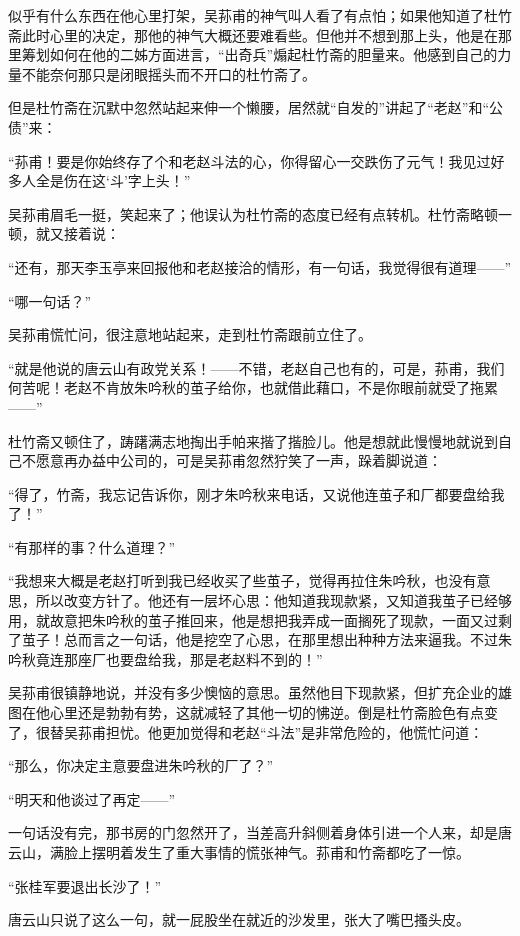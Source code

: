 \par 似乎有什么东西在他心里打架，吴荪甫的神气叫人看了有点怕；如果他知道了杜竹斋此时心里的决定，那他的神气大概还要难看些。但他并不想到那上头，他是在那里筹划如何在他的二姊方面进言，“出奇兵”煽起杜竹斋的胆量来。他感到自己的力量不能奈何那只是闭眼摇头而不开口的杜竹斋了。
\par 但是杜竹斋在沉默中忽然站起来伸一个懒腰，居然就“自发的”讲起了“老赵”和“公债”来：
\par “荪甫！要是你始终存了个和老赵斗法的心，你得留心一交跌伤了元气！我见过好多人全是伤在这‘斗’字上头！”
\par 吴荪甫眉毛一挺，笑起来了；他误认为杜竹斋的态度已经有点转机。杜竹斋略顿一顿，就又接着说：
\par “还有，那天李玉亭来回报他和老赵接洽的情形，有一句话，我觉得很有道理——”
\par “哪一句话？”
\par 吴荪甫慌忙问，很注意地站起来，走到杜竹斋跟前立住了。
\par “就是他说的唐云山有政党关系！——不错，老赵自己也有的，可是，荪甫，我们何苦呢！老赵不肯放朱吟秋的茧子给你，也就借此藉口，不是你眼前就受了拖累——”
\par 杜竹斋又顿住了，踌躇满志地掏出手帕来揩了揩脸儿。他是想就此慢慢地就说到自己不愿意再办益中公司的，可是吴荪甫忽然狞笑了一声，跺着脚说道：
\par “得了，竹斋，我忘记告诉你，刚才朱吟秋来电话，又说他连茧子和厂都要盘给我了！”
\par “有那样的事？什么道理？”
\par “我想来大概是老赵打听到我已经收买了些茧子，觉得再拉住朱吟秋，也没有意思，所以改变方针了。他还有一层坏心思：他知道我现款紧，又知道我茧子已经够用，就故意把朱吟秋的茧子推回来，他是想把我弄成一面搁死了现款，一面又过剩了茧子！总而言之一句话，他是挖空了心思，在那里想出种种方法来逼我。不过朱吟秋竟连那座厂也要盘给我，那是老赵料不到的！”
\par 吴荪甫很镇静地说，并没有多少懊恼的意思。虽然他目下现款紧，但扩充企业的雄图在他心里还是勃勃有势，这就减轻了其他一切的怫逆。倒是杜竹斋脸色有点变了，很替吴荪甫担忧。他更加觉得和老赵“斗法”是非常危险的，他慌忙问道：
\par “那么，你决定主意要盘进朱吟秋的厂了？”
\par “明天和他谈过了再定——”
\par 一句话没有完，那书房的门忽然开了，当差高升斜侧着身体引进一个人来，却是唐云山，满脸上摆明着发生了重大事情的慌张神气。荪甫和竹斋都吃了一惊。
\par “张桂军要退出长沙了！”
\par 唐云山只说了这么一句，就一屁股坐在就近的沙发里，张大了嘴巴搔头皮。
